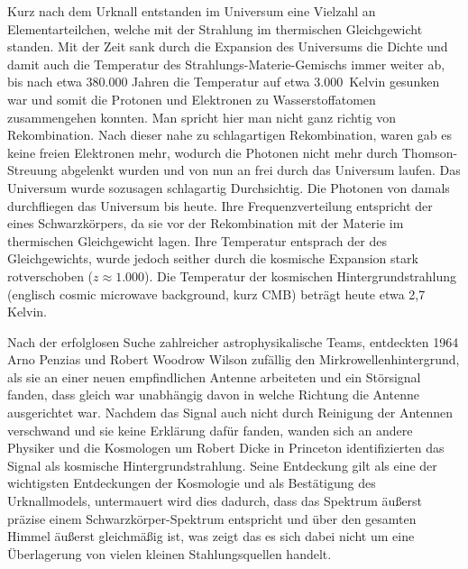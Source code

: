 \documentclass[10pt,a4paper]{article}
\begin{document}
Kurz nach dem Urknall entstanden im Universum eine Vielzahl an Elementarteilchen, welche mit der Strahlung im thermischen Gleichgewicht standen. Mit der Zeit sank durch die Expansion des Universums die Dichte und damit auch die Temperatur des Strahlungs-Materie-Gemischs immer weiter ab, bis nach etwa 380.000 Jahren die Temperatur auf etwa 3.000\ Kelvin gesunken war und somit die Protonen und Elektronen zu Wasserstoffatomen zusammengehen konnten.  %
Man spricht hier man nicht ganz richtig von Rekombination. Nach dieser nahe zu schlagartigen Rekombination, waren gab es keine freien Elektronen mehr, wodurch die Photonen nicht mehr durch Thomson-Streuung abgelenkt wurden und von nun an frei durch das Universum laufen. Das Universum wurde sozusagen schlagartig Durchsichtig. Die Photonen von damals durchfliegen das Universum bis heute. Ihre Frequenzverteilung entspricht der eines Schwarzkörpers, da sie vor der Rekombination mit der Materie im thermischen Gleichgewicht lagen. Ihre Temperatur entsprach der des Gleichgewichts, wurde jedoch seither durch die kosmische Expansion stark rotverschoben ($z\approx 1.000$). Die Temperatur der kosmischen Hintergrundstrahlung (englisch cosmic microwave background, kurz CMB) beträgt heute etwa 2,7 Kelvin.

Nach der erfolglosen Suche zahlreicher astrophysikalische Teams, entdeckten 1964 Arno Penzias und Robert Woodrow Wilson zufällig den Mirkrowellenhintergrund, als sie an einer neuen empfindlichen Antenne arbeiteten und ein Störsignal fanden, dass gleich war unabhängig davon in welche Richtung die Antenne ausgerichtet war. Nachdem das Signal auch nicht durch Reinigung der Antennen verschwand und sie keine Erklärung dafür fanden, wanden sich an andere Physiker und die Kosmologen um Robert Dicke in Princeton identifizierten das Signal als kosmische Hintergrundstrahlung. Seine Entdeckung gilt als eine der wichtigsten Entdeckungen der Kosmologie und als Bestätigung des Urknallmodels, untermauert wird dies dadurch, dass das Spektrum äußerst präzise einem Schwarzkörper-Spektrum entspricht und über den gesamten Himmel äußerst gleichmäßig ist, was zeigt das es sich dabei nicht um eine Überlagerung von vielen kleinen Stahlungsquellen handelt.
\end{document}
